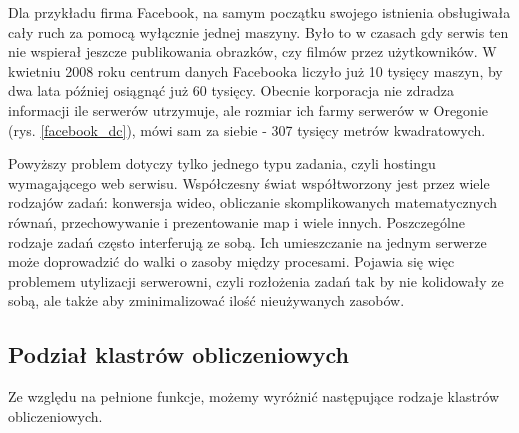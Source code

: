 \documentclass[10pt,a4paper,titlepage,twoside]{report}
\begin{document}
Dla przykładu firma Facebook, na samym początku swojego istnienia obsługiwała cały ruch za pomocą wyłącznie jednej maszyny\cite{ad4}. Było to w czasach gdy serwis ten nie wspierał jeszcze publikowania obrazków, czy filmów przez użytkowników. W kwietniu 2008 roku centrum danych Facebooka liczyło już 10 tysięcy maszyn, by dwa lata później osiągnąć już 60 tysięcy. Obecnie korporacja nie zdradza informacji ile serwerów utrzymuje, ale rozmiar ich farmy serwerów w Oregonie (rys. \ref{facebook_dc}), mówi sam za siebie - 307 tysięcy metrów kwadratowych\cite{ad5}.

Powyższy problem dotyczy tylko jednego typu zadania, czyli hostingu wymagającego web serwisu. Współczesny świat współtworzony jest przez wiele rodzajów zadań: konwersja wideo, obliczanie skomplikowanych matematycznych równań, przechowywanie i prezentowanie map i wiele innych. Poszczególne rodzaje zadań często interferują ze sobą. Ich umieszczanie na jednym serwerze może doprowadzić do walki o zasoby między procesami. Pojawia się więc problemem utylizacji serwerowni, czyli rozłożenia zadań tak by nie kolidowały ze sobą, ale także aby zminimalizować ilość nieużywanych zasobów\cite{ad5}.

\subsection{Podział klastrów obliczeniowych}\indent \indent Ze względu na pełnione funkcje, możemy wyróżnić następujące rodzaje klastrów obliczeniowych\cite{ad6}.
\end{document}
